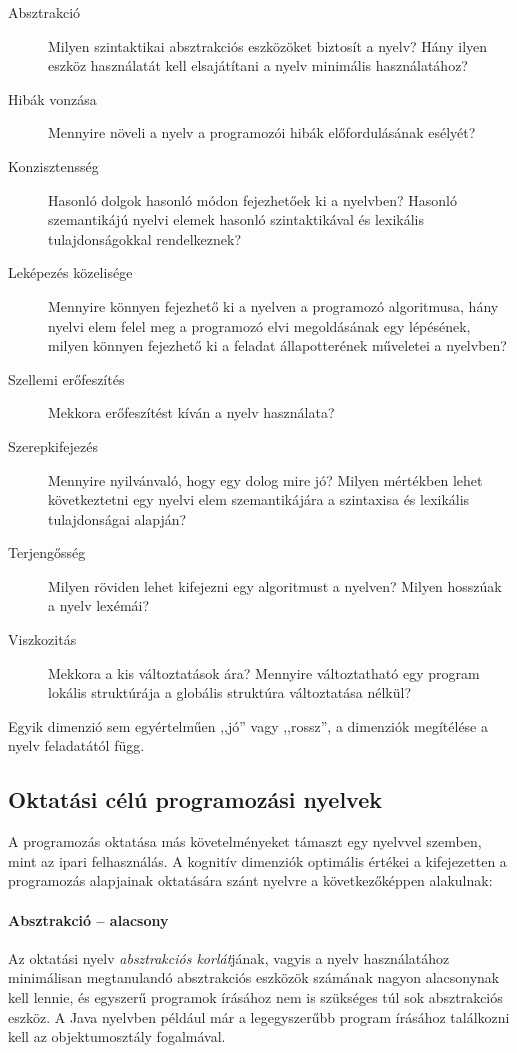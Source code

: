 \begin{description}
	\item[Absztrakció] Milyen szintaktikai absztrakciós eszközöket biztosít a nyelv? Hány ilyen eszköz használatát kell elsajátítani a nyelv minimális használatához?
	\item[Hibák vonzása] Mennyire növeli a nyelv a programozói hibák előfordulásának esélyét?
	\item[Konzisztensség] Hasonló dolgok hasonló módon fejezhetőek ki a nyelvben? Hasonló szemantikájú nyelvi elemek hasonló szintaktikával és lexikális tulajdonságokkal rendelkeznek?
	\item[Leképezés közelisége] Mennyire könnyen fejezhető ki a nyelven a programozó algoritmusa, hány nyelvi elem felel meg a programozó elvi megoldásának egy lépésének, milyen könnyen fejezhető ki a feladat állapotterének műveletei a nyelvben?
	\item[Szellemi erőfeszítés] Mekkora erőfeszítést kíván a nyelv használata?
	\item[Szerepkifejezés] Mennyire nyilvánvaló, hogy egy dolog mire jó? Milyen mértékben lehet következtetni egy nyelvi elem szemantikájára a szintaxisa és lexikális tulajdonságai alapján?
	\item[Terjengősség] Milyen röviden lehet kifejezni egy algoritmust a nyelven? Milyen hosszúak a nyelv lexémái?
	\item[Viszkozitás] Mekkora a kis változtatások ára? Mennyire változtatható egy program lokális struktúrája a globális struktúra változtatása nélkül?
\end{description}

Egyik dimenzió sem egyértelműen ,,jó'' vagy ,,rossz'', a dimenziók megítélése a nyelv feladatától függ.


\subsection{Oktatási célú programozási nyelvek}
\label{subsubsec:edulang}
A programozás oktatása más követelményeket támaszt egy nyelvvel szemben, mint az ipari felhasználás\cite{McIver01}.
A kognitív dimenziók optimális értékei a kifejezetten a programozás alapjainak oktatására szánt nyelvre a következőképpen alakulnak:

\paragraph{Absztrakció -- alacsony} Az oktatási nyelv \textit{absztrakciós korlát}jának, vagyis a nyelv használatához minimálisan megtanulandó absztrakciós eszközök számának nagyon alacsonynak kell lennie, és egyszerű programok írásához nem is szükséges túl sok absztrakciós eszköz.
A Java nyelvben például már a legegyszerűbb program írásához találkozni kell az objektumosztály fogalmával.


